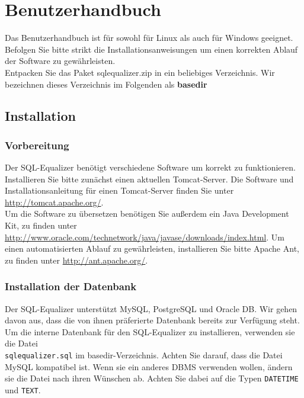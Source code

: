 \section{Benutzerhandbuch} 

Das Benutzerhandbuch ist für sowohl für Linux als auch für Windows geeignet. Befolgen Sie bitte strikt die Installationsanweisungen um einen korrekten Ablauf der Software zu gewährleisten.\\

Entpacken Sie das Paket sqlequalizer.zip in ein beliebiges Verzeichnis. Wir bezeichnen dieses Verzeichnis im Folgenden als \textbf{basedir}\\

\subsection{Installation}

\subsubsection{Vorbereitung}

Der SQL-Equalizer benötigt verschiedene Software um korrekt zu funktionieren. Installieren Sie bitte zunächst einen aktuellen Tomcat-Server. Die Software und Installationsanleitung für einen Tomcat-Server finden Sie unter \url{http://tomcat.apache.org/}.\\

Um die Software zu übersetzen benötigen Sie außerdem ein Java Development Kit, zu finden unter \url{http://www.oracle.com/technetwork/java/javase/downloads/index.html}. Um einen automatisierten Ablauf zu gewährleisten, installieren Sie bitte Apache Ant, zu finden unter \url{http://ant.apache.org/}.\\

\subsubsection{Installation der Datenbank}

Der SQL-Equalizer unterstützt MySQL, PostgreSQL und Oracle DB. Wir gehen davon aus, dass die von ihnen präferierte Datenbank bereits zur Verfügung steht.\\

Um die interne Datenbank für den SQL-Equalizer zu installieren, verwenden sie die Datei\\\verb|sqlequalizer.sql| im basedir-Verzeichnis. Achten Sie darauf, dass die Datei MySQL kompatibel ist. Wenn sie ein anderes DBMS verwenden wollen, ändern sie die Datei nach ihren Wünschen ab. Achten Sie dabei auf die Typen \verb|DATETIME| und \verb|TEXT|.\\

